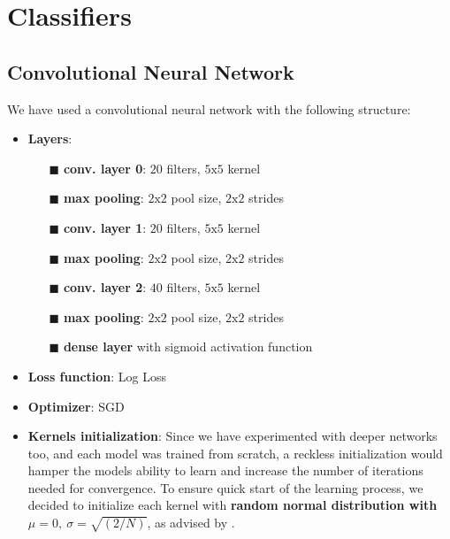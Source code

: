     \section{Classifiers}
        \subsection{Convolutional Neural Network}
        We have used a convolutional neural network with the following structure:
        \begin{itemize}
            \item \textbf{Layers}:
            \begin{itemize}
            \item[$\blacksquare$] \textbf{conv. layer 0}: $20$ filters, $5 \text{x} 5$ kernel
            \item[$\blacksquare$] \textbf{max pooling}: $2 \text{x} 2$ pool size, $2 \text{x} 2$ strides
            \item[$\blacksquare$] \textbf{conv. layer 1}: $20$ filters, $5 \text{x} 5$ kernel
            \item[$\blacksquare$] \textbf{max pooling}: $2 \text{x} 2$ pool size, $2 \text{x} 2$ strides
            \item[$\blacksquare$] \textbf{conv. layer 2}: $40$ filters, $5 \text{x} 5$ kernel
            \item[$\blacksquare$] \textbf{max pooling}: $2 \text{x} 2$ pool size, $2 \text{x} 2$ strides
            \item[$\blacksquare$] \textbf{dense layer} with sigmoid activation function
            \end{itemize}
            \item \textbf{Loss function}: Log Loss
            \item \textbf{Optimizer}: SGD
            \item \textbf{Kernels initialization}: Since we have experimented with deeper
            networks too, and each model was trained from scratch, a reckless initialization
            would hamper the models ability to learn and increase the number of
            iterations needed for convergence. To ensure quick start of the learning
            process, we decided to initialize each kernel with \textbf{random normal
            distribution with $\mu = 0,\ \sigma = \sqrt{(2 / N)}$}, as advised by
            \citeauthor{initialization}.
        \end{itemize}


